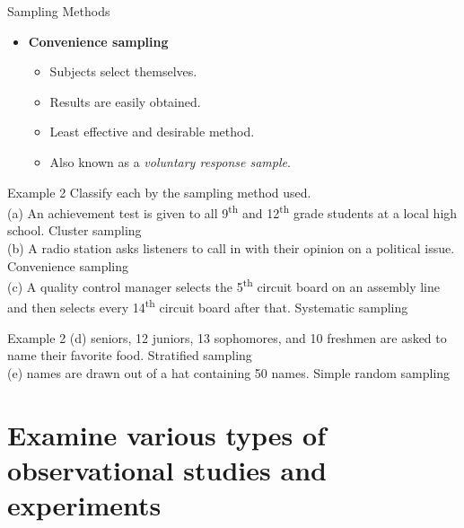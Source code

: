\documentclass[t]{beamer}
\begin{document}
\begin{frame}{Sampling Methods}
\begin{itemize}
	\item<+-> \textbf{Convenience sampling}
	\begin{itemize}
		\item<+-> Subjects select themselves.
		\item<+-> Results are easily obtained.
		\item<+-> Least effective and desirable method.
		\item<+-> Also known as a \textit{voluntary response sample}.
	\end{itemize}
\end{itemize}
\end{frame}

\begin{frame}{Example 2}
Classify each by the sampling method used.	\newline\\
(a) \quad An achievement test is given to all 9\textsuperscript{th} and 12\textsuperscript{th} grade students at a local high school.	\quad	\pause
\alert{Cluster sampling} \newline\\	\pause
(b) \quad A radio station asks listeners to call in with their opinion on a political issue.	\quad	\pause
\alert{Convenience sampling} \newline\\ \pause
(c) \quad A quality control manager selects the 5\textsuperscript{th} circuit board on an assembly line and then selects every 14\textsuperscript{th} circuit board after that.	\quad	\pause
\alert{Systematic sampling} 
\end{frame}

\begin{frame}{Example 2}
(d)  seniors, 12 juniors, 13 sophomores, and 10 freshmen are asked to name their favorite food. \quad \pause
\alert{Stratified sampling} \newline\\ \pause
(e)  names are drawn out of a hat containing 50 names. \quad \pause
\alert{Simple random sampling}
\end{frame}

\section{Examine various types of observational studies and experiments}
\end{document}
